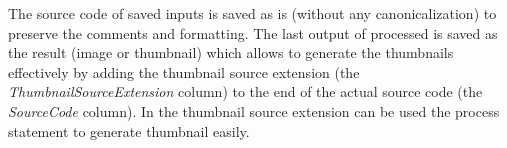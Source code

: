 The source code of saved inputs is saved as is (without any canonicalization) to preserve the comments and formatting.
The last output of processed \lsystem is saved as the result (image or thumbnail) which allows to generate the thumbnails effectively by adding the thumbnail source extension (the \emph{ThumbnailSourceExtension} column) to the end of the actual source code (the \emph{SourceCode} column).
In the thumbnail source extension can be used the process statement to generate thumbnail easily.






































